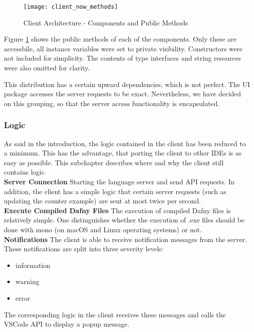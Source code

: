 \begin{figure}[H]
    \centering
    \texttt{[image: client\_now\_methods]}
    \caption{Client Architecture - Components and Public Methods}
    \label{fig:client_now_methods}
\end{figure}

Figure \ref{fig:client_now_methods} shows the public methods of each of the components. Only these are accessbile, all instance variables were set to private visibility. Constructors were not included for simplicity. The contents of type interfaces and string resources were also omitted for clarity.


This distribution has a certain upward dependencies, which is not perfect.
The UI package accesses the server requests to be exact.
Nevertheless, we have decided on this grouping,
so that the server access functionality is encapsulated.

\subsubsection{Logic}
As said in the introduction, the logic contained in the client has been reduced to a minimum.
This has the advantage, that porting the client to other IDEs is as easy as possible.
This subchapter describes where and why the client still contains logic.\\

{\bf Server Connection} \textendash{}
Starting the language server and send API requests. In addition, the client has a simple logic that
certain server requests (such as updating the counter example) are sent at most twice per second. \\

{\bf Execute Compiled Dafny Files} \textendash{}
The execution of compiled Dafny files is relatively simple. One distinguishes whether the execution
of .exe files should be done with mono (on macOS and Linux operating systems) or not. \\

{\bf Notifications} \textendash{}
The client is able to receive notification messages from the server.
These notifications are split into three severity levels:
\begin{itemize}
    \item information
    \item warning
    \item error
\end{itemize}
The corresponding logic in the client receives these messages and calls the VSCode API to display a popup message. \\

